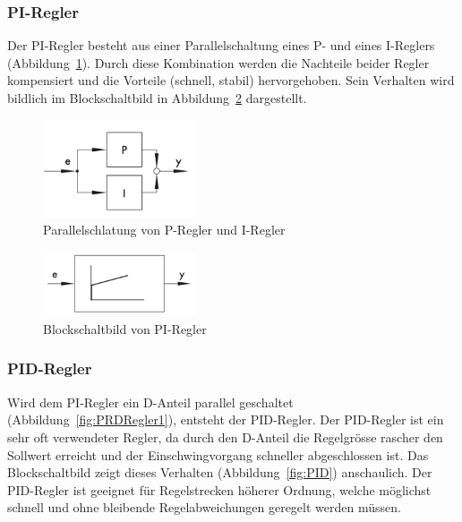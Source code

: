\subsubsection*{PI-Regler}
Der  PI-Regler  besteht  aus  einer   Parallelschaltung  eines  P-  und  eines
I-Reglers  (Abbildung~\ref{fig:PIRegler1}). Durch   diese  Kombination  werden
die   Nachteile  beider   Regler  kompensiert   und  die   Vorteile  (schnell,
stabil)  hervorgehoben. Sein Verhalten  wird  bildlich  im Blockschaltbild  in
Abbildung~\ref{fig:PIRegler2} dargestellt.

\begin{figure}[h!, width=\pagewidth]
    \centering
    \includegraphics[width=0.4\textwidth]{images/PIRegler1}
    \caption{Parallelschlatung von P-Regler und I-Regler}
    \label{fig:PIRegler1}
\end{figure}

\begin{figure}[h!, width=\pagewidth]
    \centering
    \includegraphics[width=0.4\textwidth]{images/PIRegler2}
    \caption{Blockschaltbild von PI-Regler}
    \label{fig:PIRegler2}
\end{figure}


\subsubsection*{PID-Regler}

Wird      dem     PI-Regler      ein     D-Anteil      parallel     geschaltet
(Abbildung~\ref{fig:PRDRegler1}),  entsteht   der  PID-Regler. Der  PID-Regler
ist   ein  sehr   oft  verwendeter   Regler,   da  durch   den  D-Anteil   die
Regelgr\"osse  rascher   den  Sollwert  erreicht  und   der  Einschwingvorgang
schneller  abgeschlossen  ist. Das   Blockschaltbild  zeigt  dieses  Verhalten
(Abbildung~\ref{fig:PID})  anschaulich. Der  PID-Regler   ist  geeignet  f\"ur
Regelstrecken h\"oherer Ordnung, welche m\"oglichst schnell und ohne bleibende
Regelabweichungen geregelt werden m\"ussen.

